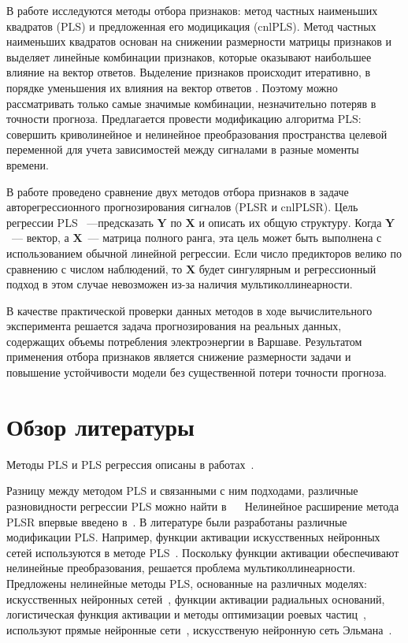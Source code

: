 \documentclass[12pt,fleqn,unicode]{article}
\newcommand{\bY}{\mathbf{Y}}
\newcommand{\bX}{\mathbf{X}}
\begin{document}
В работе исследуются методы отбора признаков: метод частных наименьших квадратов (PLS) \cite{Ng2013} и предложенная его модицикация (cnlPLS).
Метод частных наименьших квадратов основан на снижении размерности матрицы признаков и выделяет линейные комбинации признаков, которые оказывают наибольшее влияние на вектор ответов. Выделение признаков происходит итеративно, в порядке уменьшения их влияния на вектор ответов \cite{Ng2013}. Поэтому можно рассматривать только самые значимые комбинации, незначительно потеряв в точности прогноза. 
Предлагается провести модификацию алгоритма PLS: совершить криволинейное и нелинейное преобразования пространства целевой переменной для учета зависимостей между сигналами в разные моменты времени.


В работе проведено сравнение двух методов отбора признаков в задаче авторегрессионного прогнозирования сигналов (PLSR и cnlPLSR). 
Цель регрессии PLS \cite{Abdi2003}~---предсказать $\bY$ по $\bX$ и описать их общую структуру. Когда $\bY$~--- вектор, а $\bX$~--- матрица полного ранга, эта цель может быть выполнена с использованием обычной линейной регрессии. Если число предикторов велико по сравнению с числом наблюдений, то $\bX$ будет сингулярным и регрессионный подход в этом случае невозможен из-за наличия мультиколлинеарности.

В качестве практической проверки данных методов в ходе вычислительного эксперимента решается задача прогнозирования на реальных данных, содержащих объемы потребления электроэнергии в Варшаве.
Результатом применения отбора признаков является снижение размерности задачи и повышение устойчивости модели без существенной потери точности прогноза.
 

\newpage
\section{Обзор литературы}
Методы PLS и PLS регрессия описаны в работах~\cite{Geladi1988, Hoskuldsson1988}. 

Разницу между методом PLS и связанными с ним подходами, различные разновидности регрессии PLS можно найти в~\cite{Lehky2014}
 
Нелинейное расширение метода PLSR впервые введено в~\cite{Frank1990}. В литературе были разработаны различные модификации PLS. Например, функции активации искусственных нейронных сетей используются в методе PLS~\cite{Malthouse1997}. Поскольку функции активации обеспечивают нелинейные преобразования, решается проблема мультиколлинеарности. Предложены нелинейные методы PLS, основанные на различных моделях:  искусственных нейронных сетей~\cite{Mcavovt1992}, функции активации радиальных оснований\cite{Yan2003}, логистическая функция активации и методы оптимизации роевых частиц~\cite{Zhou2007}, используют прямые нейронные сети~\cite{Xuefeng2010}, искусственую нейронную сеть Эльмана~\cite{Bulut2014}.
\end{document}

